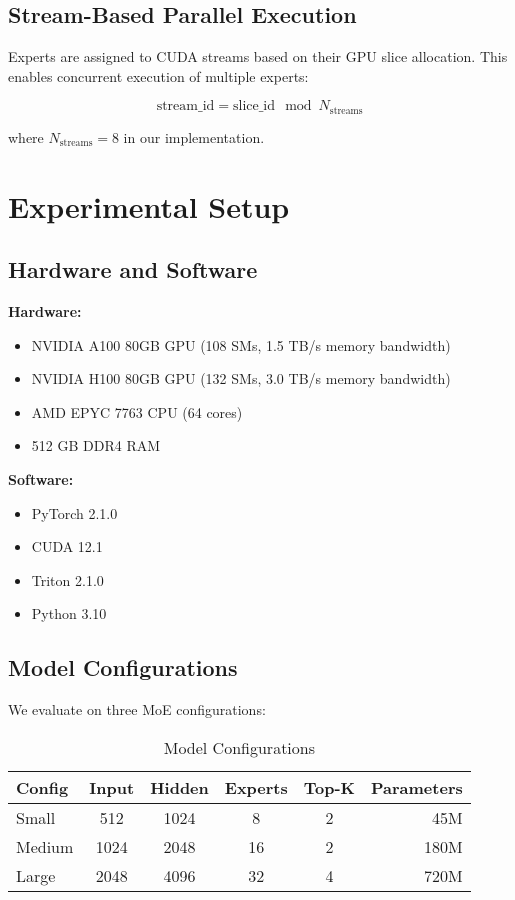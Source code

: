 \documentclass{article}
\begin{document}
\subsection{Stream-Based Parallel Execution}

Experts are assigned to CUDA streams based on their GPU slice allocation. This enables concurrent execution of multiple experts:

\begin{equation}
\text{stream\_id} = \text{slice\_id} \mod N_{\text{streams}}
\end{equation}

where $N_{\text{streams}} = 8$ in our implementation.

\section{Experimental Setup}

\subsection{Hardware and Software}

\textbf{Hardware:}
\begin{itemize}
    \item NVIDIA A100 80GB GPU (108 SMs, 1.5 TB/s memory bandwidth)
    \item NVIDIA H100 80GB GPU (132 SMs, 3.0 TB/s memory bandwidth)
    \item AMD EPYC 7763 CPU (64 cores)
    \item 512 GB DDR4 RAM
\end{itemize}

\textbf{Software:}
\begin{itemize}
    \item PyTorch 2.1.0
    \item CUDA 12.1
    \item Triton 2.1.0
    \item Python 3.10
\end{itemize}

\subsection{Model Configurations}

We evaluate on three MoE configurations:

\begin{table}[h]
\centering
\caption{Model Configurations}
\begin{tabular}{lccccr}
\toprule
Config & Input & Hidden & Experts & Top-K & Parameters \\
\midrule
Small  & 512   & 1024   & 8       & 2     & 45M        \\
Medium & 1024  & 2048   & 16      & 2     & 180M       \\
Large  & 2048  & 4096   & 32      & 4     & 720M       \\
\bottomrule
\end{tabular}
\end{table}
\end{document}
